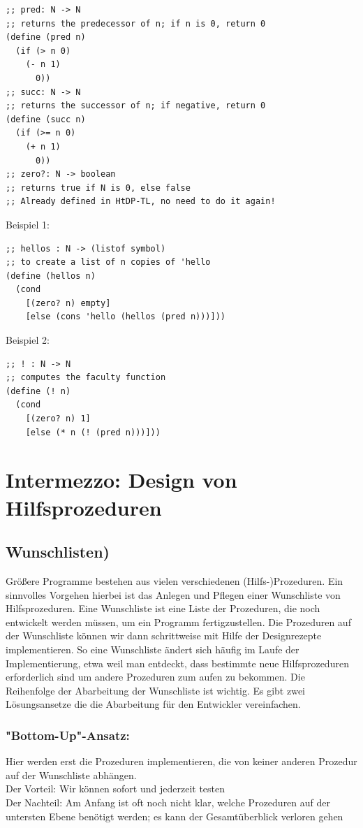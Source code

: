 \begin{lstlisting}
;; pred: N -> N
;; returns the predecessor of n; if n is 0, return 0
(define (pred n)
  (if (> n 0)
    (- n 1)
      0))
;; succ: N -> N
;; returns the successor of n; if negative, return 0
(define (succ n)
  (if (>= n 0)
    (+ n 1)
      0))
;; zero?: N -> boolean
;; returns true if N is 0, else false
;; Already defined in HtDP-TL, no need to do it again!
\end{lstlisting}

Beispiel 1:
\begin{lstlisting}
;; hellos : N -> (listof symbol)
;; to create a list of n copies of 'hello
(define (hellos n)
  (cond
    [(zero? n) empty]
    [else (cons 'hello (hellos (pred n)))]))
\end{lstlisting}

Beispiel 2:
\begin{lstlisting}
;; ! : N -> N
;; computes the faculty function
(define (! n)
  (cond
    [(zero? n) 1]
    [else (* n (! (pred n)))]))
\end{lstlisting}

\section{Intermezzo: Design von Hilfsprozeduren}
\subsection{Wunschlisten)}
Größere Programme bestehen aus vielen verschiedenen
(Hilfs-)Prozeduren. Ein sinnvolles Vorgehen hierbei ist das Anlegen und Pflegen einer Wunschliste von Hilfsprozeduren. Eine Wunschliste ist eine Liste der Prozeduren, die noch entwickelt werden müssen, um ein Programm fertigzustellen. Die Prozeduren auf der Wunschliste können wir dann schrittweise mit Hilfe der Designrezepte implementieren. So eine Wunschliste ändert sich häufig im Laufe der Implementierung, etwa weil man entdeckt, dass bestimmte neue Hilfsprozeduren erforderlich sind um andere Prozeduren zum aufen zu bekommen. Die Reihenfolge der Abarbeitung der Wunschliste ist wichtig. Es gibt zwei Lösungsansetze die die Abarbeitung für den Entwickler vereinfachen. \\
\subsubsection{"Bottom-Up"-Ansatz:}
Hier werden erst die Prozeduren implementieren, die von keiner anderen Prozedur auf der Wunschliste abhängen.\\Der Vorteil: Wir können sofort und jederzeit testen\\
Der Nachteil: Am Anfang ist oft noch nicht klar, welche Prozeduren auf
der untersten Ebene benötigt werden; es kann der Gesamtüberblick
verloren gehen
